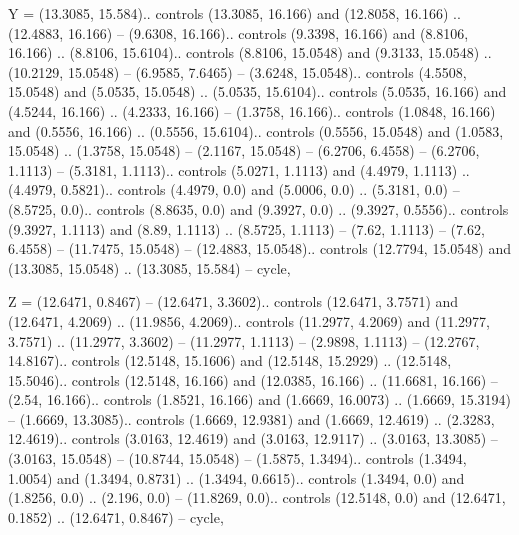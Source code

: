Y = {(13.3085, 15.584).. controls (13.3085, 16.166) and (12.8058, 16.166) .. (12.4883, 16.166) -- (9.6308, 16.166).. controls (9.3398, 16.166) and (8.8106, 16.166) .. (8.8106, 15.6104).. controls (8.8106, 15.0548) and (9.3133, 15.0548) .. (10.2129, 15.0548) -- (6.9585, 7.6465) -- (3.6248, 15.0548).. controls (4.5508, 15.0548) and (5.0535, 15.0548) .. (5.0535, 15.6104).. controls (5.0535, 16.166) and (4.5244, 16.166) .. (4.2333, 16.166) -- (1.3758, 16.166).. controls (1.0848, 16.166) and (0.5556, 16.166) .. (0.5556, 15.6104).. controls (0.5556, 15.0548) and (1.0583, 15.0548) .. (1.3758, 15.0548) -- (2.1167, 15.0548) -- (6.2706, 6.4558) -- (6.2706, 1.1113) -- (5.3181, 1.1113).. controls (5.0271, 1.1113) and (4.4979, 1.1113) .. (4.4979, 0.5821).. controls (4.4979, 0.0) and (5.0006, 0.0) .. (5.3181, 0.0) -- (8.5725, 0.0).. controls (8.8635, 0.0) and (9.3927, 0.0) .. (9.3927, 0.5556).. controls (9.3927, 1.1113) and (8.89, 1.1113) .. (8.5725, 1.1113) -- (7.62, 1.1113) -- (7.62, 6.4558) -- (11.7475, 15.0548) -- (12.4883, 15.0548).. controls (12.7794, 15.0548) and (13.3085, 15.0548) .. (13.3085, 15.584) -- cycle},

Z = {(12.6471, 0.8467) -- (12.6471, 3.3602).. controls (12.6471, 3.7571) and (12.6471, 4.2069) .. (11.9856, 4.2069).. controls (11.2977, 4.2069) and (11.2977, 3.7571) .. (11.2977, 3.3602) -- (11.2977, 1.1113) -- (2.9898, 1.1113) -- (12.2767, 14.8167).. controls (12.5148, 15.1606) and (12.5148, 15.2929) .. (12.5148, 15.5046).. controls (12.5148, 16.166) and (12.0385, 16.166) .. (11.6681, 16.166) -- (2.54, 16.166).. controls (1.8521, 16.166) and (1.6669, 16.0073) .. (1.6669, 15.3194) -- (1.6669, 13.3085).. controls (1.6669, 12.9381) and (1.6669, 12.4619) .. (2.3283, 12.4619).. controls (3.0163, 12.4619) and (3.0163, 12.9117) .. (3.0163, 13.3085) -- (3.0163, 15.0548) -- (10.8744, 15.0548) -- (1.5875, 1.3494).. controls (1.3494, 1.0054) and (1.3494, 0.8731) .. (1.3494, 0.6615).. controls (1.3494, 0.0) and (1.8256, 0.0) .. (2.196, 0.0) -- (11.8269, 0.0).. controls (12.5148, 0.0) and (12.6471, 0.1852) .. (12.6471, 0.8467) -- cycle},